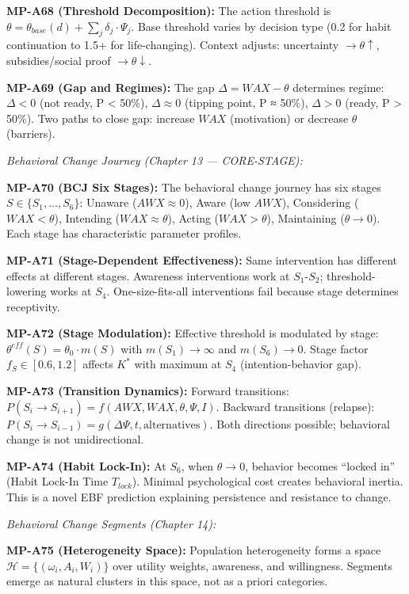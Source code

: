 \begin{tcolorbox}[colback=gray!5!white, colframe=gray!75!black,
    title=\textbf{MP Axioms}]
\textbf{MP-A68 (Threshold Decomposition):} The action threshold is $\theta = \theta_{base}(d) + \sum_j \delta_j \cdot \Psi_j$. Base threshold varies by decision type (0.2 for habit continuation to 1.5+ for life-changing). Context adjusts: uncertainty $\to \theta \uparrow$, subsidies/social proof $\to \theta \downarrow$.

\textbf{MP-A69 (Gap and Regimes):} The gap $\Delta = WAX - \theta$ determines regime: $\Delta < 0$ (not ready, P < 50\%), $\Delta \approx 0$ (tipping point, P ≈ 50\%), $\Delta > 0$ (ready, P > 50\%). Two paths to close gap: increase $WAX$ (motivation) or decrease $\theta$ (barriers).

\medskip
\textit{Behavioral Change Journey (Chapter 13 --- CORE-STAGE):}

\textbf{MP-A70 (BCJ Six Stages):} The behavioral change journey has six stages $S \in \{S_1, ..., S_6\}$: Unaware ($AWX \approx 0$), Aware (low $AWX$), Considering ($WAX < \theta$), Intending ($WAX \approx \theta$), Acting ($WAX > \theta$), Maintaining ($\theta \to 0$). Each stage has characteristic parameter profiles.

\textbf{MP-A71 (Stage-Dependent Effectiveness):} Same intervention has different effects at different stages. Awareness interventions work at $S_1$-$S_2$; threshold-lowering works at $S_4$. One-size-fits-all interventions fail because stage determines receptivity.

\textbf{MP-A72 (Stage Modulation):} Effective threshold is modulated by stage: $\theta^{eff}(S) = \theta_0 \cdot m(S)$ with $m(S_1) \to \infty$ and $m(S_6) \to 0$. Stage factor $f_S \in [0.6, 1.2]$ affects $K^*$ with maximum at $S_4$ (intention-behavior gap).

\textbf{MP-A73 (Transition Dynamics):} Forward transitions: $P(S_i \to S_{i+1}) = f(AWX, WAX, \theta, \Psi, I)$. Backward transitions (relapse): $P(S_i \to S_{i-1}) = g(\Delta\Psi, t, \text{alternatives})$. Both directions possible; behavioral change is not unidirectional.

\textbf{MP-A74 (Habit Lock-In):} At $S_6$, when $\theta \to 0$, behavior becomes ``locked in'' (Habit Lock-In Time $T_{lock}$). Minimal psychological cost creates behavioral inertia. This is a novel EBF prediction explaining persistence and resistance to change.

\medskip
\textit{Behavioral Change Segments (Chapter 14):}

\textbf{MP-A75 (Heterogeneity Space):} Population heterogeneity forms a space $\mathcal{H} = \{(\omega_i, A_i, W_i)\}$ over utility weights, awareness, and willingness. Segments emerge as natural clusters in this space, not as a priori categories.


\end{tcolorbox}
